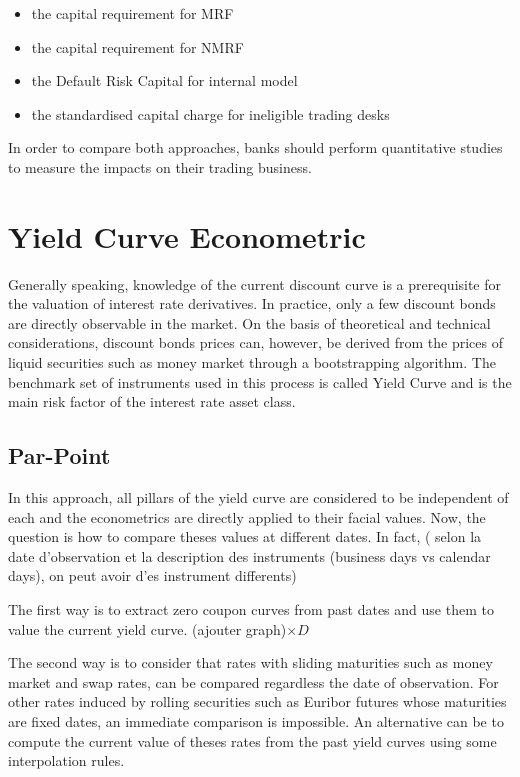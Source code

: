 \documentclass[10pt,a4paper]{report}
\begin{document}
\begin{itemize}
\item the capital requirement for MRF
\item the capital requirement for NMRF
\item the Default Risk Capital for internal model
\item the standardised capital charge for ineligible trading desks
\end{itemize}

\bigskip

In order to compare both approaches,  banks should perform quantitative studies to measure the impacts on their trading business.

\newpage
\section{Yield Curve Econometric}

Generally speaking, knowledge of the current discount curve is a prerequisite for the valuation of interest rate derivatives. In practice, only a few discount bonds are directly observable in the market. On the basis of theoretical and technical considerations, discount bonds prices can, however, be derived from the prices of liquid securities such as money market  through a bootstrapping algorithm. The benchmark set of instruments used in this process is called Yield Curve and is the main risk factor of the interest rate asset class.


\subsection{Par-Point}

In this approach, all pillars of the yield curve are considered to be independent of each
and the econometrics are directly applied to their facial values. Now, the
question is how to compare theses values at different dates. In fact, (
selon la date d'observation et la description des instruments (business days
vs calendar days), on peut avoir d'es instrument differents)

\bigskip

The first way is to extract zero coupon curves from past dates and use them
to value the current yield curve. (ajouter graph)$\times D$

\bigskip

\bigskip

\bigskip

The second way is to consider that rates with sliding maturities such as
money market and swap rates, can be compared regardless the date of
observation. For other rates induced by rolling securities such as Euribor
futures whose maturities are fixed dates, an immediate comparison is
impossible. An alternative can be to compute the current value of theses
rates from the past yield curves using some interpolation rules.
\end{document}
